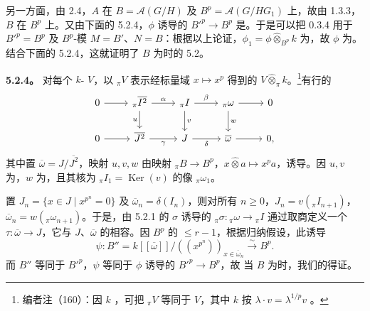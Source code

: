 另一方面，由 2.4，$A$ 在 $B=\mathcal A(G/H)$ 及 $B^p=\mathcal A(G/HG_1)$ 上，故由 1.3.3，$B$ 在 $B^p$ 上。又由下面的 5.2.4，$\phi$ 诱导的 $B'^p\to B^p$ 是。于是可以把 0.3.4 用于 $B'^p=B^p$ 及 $B^p$-模 $M=B'$、$N=B$：根据以上论证，$\phi_1=\phi\widehat\otimes_{B^p}k$ 为，故 $\phi$ 为。结合下面的 5.2.4，这就证明了 $B$ 为时的 5.2。

\textbf{5.2.4。} 对每个 $k$- $V$，以 ${}_\pi V$ 表示经标量域 $x\mapsto x^p$ 得到的 $V\widehat\otimes_\pi k$。\footnote{编者注（160）：因 $k$ ，可把 ${}_\pi V$ 等同于 $V$，其中 $k$ 按 $\lambda\cdot v=\lambda^{1/p}v$ 。}有行的
\[
\begin{tikzcd}
0\arrow[r]&{}_\pi\overline{I^2}\arrow[r,"\alpha"]\arrow[d,"u"']&{}_\pi I\arrow[r,"\beta"]\arrow[d,"v"]&{}_\pi\omega\arrow[r]\arrow[d,"w"]&0\\
0\arrow[r]&\overline{J^2}\arrow[r,"\gamma"']&J\arrow[r,"\delta"']&\overline\omega\arrow[r]&0,
\end{tikzcd}
\]
其中置 $\overline\omega=J/\overline{J^2}$，映射 $u,v,w$ 由映射 ${}_\pi B\to B^p$，$x\widehat\otimes a\mapsto x^pa$，诱导。因 $u,v$ 为，$w$ 为，且其核为 ${}_\pi I_1=\operatorname{Ker}(v)$ 的像 ${}_\pi\omega_1$。

置 $J_n=\{x\in J\mid x^{p^n}=0\}$ 及 $\overline\omega_n=\delta(I_n)$，则对所有 $n\geq0$，$J_n=v({}_\pi I_{n+1})$，$\overline\omega_n=w({}_\pi\omega_{n+1})$。于是，由 5.2.1 的 $\sigma$ 诱导的 ${}_\pi\sigma:{}_\pi\omega\to{}_\pi I$ 通过取商定义一个 $\tau:\overline\omega\to J$，它与 $J$、$\overline\omega$ 的相容。因 $B^p$ 的 $\leq r-1$，根据归纳假设，此诱导
\[
\psi:B''=k[[\overline\omega]]/((x^{p^n}))_{x\in\overline\omega_n}\xrightarrow{\sim}B^p.
\]
而 $B''$ 等同于 $B'^p$，$\psi$ 等同于 $\phi$ 诱导的 $B'^p\to B^p$，故
当 $B$ 为时，我们的得证。

